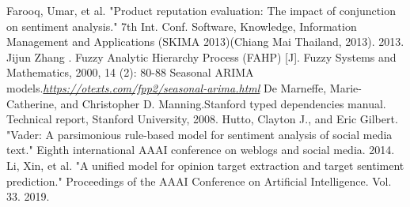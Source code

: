\documentclass[12pt]{article}  %
\begin{document}
\begin{thebibliography}{99}
 Farooq, Umar, et al. "Product reputation evaluation: The impact of conjunction on sentiment analysis." 7th Int. Conf. Software, Knowledge, Information Management and Applications (SKIMA 2013)(Chiang Mai Thailand, 2013). 2013.
 Jijun Zhang . Fuzzy Analytic Hierarchy Process (FAHP) [J]. Fuzzy Systems and Mathematics, 2000, 14 (2): 80-88
 Seasonal ARIMA models.\emph{\url{https://otexts.com/fpp2/seasonal-arima.html}}
 De Marneffe, Marie-Catherine, and Christopher D. Manning.Stanford typed dependencies manual.  Technical report, Stanford University, 2008. 
 Hutto, Clayton J., and Eric Gilbert. "Vader: A parsimonious rule-based model for sentiment analysis of social media text." Eighth international AAAI conference on weblogs and social media. 2014.
 Li, Xin, et al. "A unified model for opinion target extraction and target sentiment prediction." Proceedings of the AAAI Conference on Artificial Intelligence. Vol. 33. 2019.
\end{thebibliography}
\end{document}

